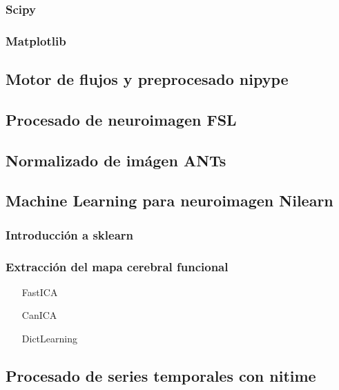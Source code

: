 \subsubsection{Scipy}
\subsubsection{Matplotlib}

\subsection{Motor de flujos y preprocesado nipype}

\subsection{Procesado de neuroimagen FSL}

\subsection{Normalizado de imágen ANTs}

\subsection{Machine Learning para neuroimagen Nilearn}

\subsubsection{Introducción a sklearn}

\subsubsection{Extracción del mapa cerebral funcional}

\begin{itemize}
\item[FastICA]
\item[CanICA]
\item[DictLearning]
\end{itemize}

\subsection{Procesado de series temporales con nitime}